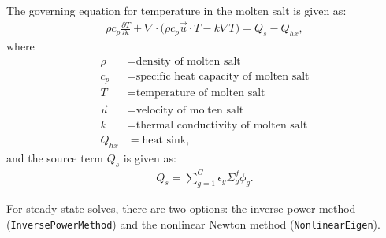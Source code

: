 The governing equation for temperature in the molten salt is given as:
%
\begin{align}
	\rho c_{p} \frac{\partial T}{\partial t} + \nabla \cdot \big( \rho
	c_{p} \overrightarrow{u} \cdot T - k \nabla T \big) = Q_s - Q_{hx},
	\label{eq3}
\end{align}
%
	where
{\small
\begin{align*}
	\rho &= \text{density of molten salt} \\
	c_{p} &= \text{specific heat capacity of molten salt} \\
	T &= \text{temperature of molten salt} \\
	\overrightarrow{u} &= \text{velocity of molten salt} \\
	k &= \text{thermal conductivity of molten salt} \\
	Q_{hx} &= \text{heat sink},
\end{align*}
}
	and the source term $Q_s$ is given as:
%
\begin{align}
Q_s = \sum^G_{g=1} \epsilon_g \Sigma_g^f \phi_g. \label{eq4}
\end{align}

For steady-state solves, there are two options: the inverse power
method (\texttt{InversePowerMethod}) and the nonlinear Newton method
(\texttt{NonlinearEigen}). 
